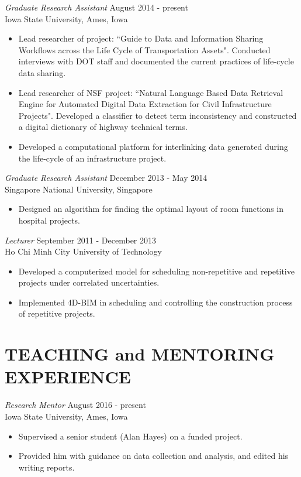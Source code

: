 \documentclass[11pt]{article}
\begin{document}
{\sl Graduate Research Assistant} \hfill August 2014 - present \\
Iowa State University, Ames, Iowa
\begin{itemize}
\item Lead researcher of project: ``Guide to Data and Information Sharing Workflows across the Life Cycle of Transportation Assets". Conducted interviews with DOT staff and documented the current practices of life-cycle data sharing.
\item Lead researcher of NSF project: ``Natural Language Based Data Retrieval Engine for Automated Digital Data Extraction for Civil Infrastructure Projects". Developed a classifier to detect term inconsistency and constructed a digital dictionary of highway technical terms.
\item Developed a computational platform for interlinking data generated during the life-cycle of an infrastructure project.
\end{itemize}

{\sl Graduate Research Assistant} \hfill December 2013 - May 2014 \\
Singapore National University, Singapore
\begin{itemize}
\item Designed an algorithm for finding the optimal layout of room functions in hospital projects.
\end{itemize}

{\sl Lecturer} \hfill September 2011 - December 2013 \\
Ho Chi Minh City University of Technology
\begin{itemize}
\item Developed a computerized model for scheduling non-repetitive and repetitive projects under correlated uncertainties.
\item Implemented 4D-BIM in scheduling and controlling the construction process of repetitive projects.
\end{itemize} 
\section*{TEACHING and MENTORING EXPERIENCE}

{\sl Research Mentor} \hfill August 2016 - present \\
Iowa State University, Ames, Iowa
\begin{itemize}
\item Supervised a senior student (Alan Hayes) on a funded project. 
\item Provided him with guidance on data collection and analysis, and edited his writing reports.
\end{itemize} 
\end{document}

